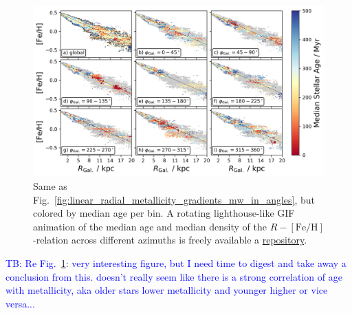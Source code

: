 \documentclass[fleqn,usenatbib]{mnras}
\newcommand{\TB}[1]{{\textcolor{blue}{TB: #1}}}
\begin{document}
\begin{figure}
    \centering
    \includegraphics[width=\textwidth]{figures/radial_metallicity_gradients_mw_in_angles_age.png}
    \caption{Same as Fig.~\ref{fig:linear_radial_metallicity_gradients_mw_in_angles}, but colored by median age per bin. A rotating lighthouse-like GIF animation of the median age and median density of the $R-\mathrm{[Fe/H]}$-relation across different azimuths is freely available a \href{https://github.com/svenbuder/nihao_radial_metallicity_gradients/blob/main/figures/xyz_rfeh.gif}{repository}.}
    \label{fig:radial_metallicity_gradients_mw_in_angles_age}
\end{figure}

\TB{Re Fig.~\ref{fig:radial_metallicity_gradients_mw_in_angles_age}: very interesting figure, but I need time to digest and take away a conclusion from this. doesn't really seem like there is a strong correlation of age with metallicity, aka older stars lower metallicity and younger higher or vice versa...}
\end{document}
